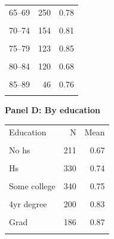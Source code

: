 \begin{table}[htbp]
\begin{minipage}[t]{0.48\textwidth}
\begin{tabular}{lrr}
65--69 & 250 & 0.78 \\\\
70--74 & 154 & 0.81 \\\\
75--79 & 123 & 0.85 \\\\
80--84 & 120 & 0.68 \\\\
85--89 & 46 & 0.76 \\\\
\bottomrule\end{tabular}
\end{minipage}
\hfill
\begin{minipage}[t]{0.48\textwidth}\centering
\textbf{Panel D: By education}\\[0.3em]
\begin{tabular}{lrr}\toprule
Education & N & Mean \\\\ \midrule
No hs & 211 & 0.67 \\\\
Hs & 330 & 0.74 \\\\
Some college & 340 & 0.75 \\\\
4yr degree & 200 & 0.83 \\\\
Grad & 186 & 0.87 \\\\
\bottomrule\end{tabular}
\end{minipage}
\end{table}
